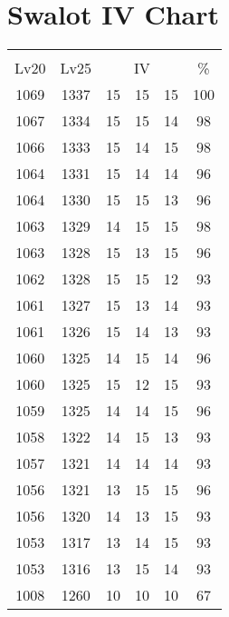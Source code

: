 \documentclass{article}%
\begin{document}
%
\normalsize%
\section{Swalot IV Chart}%
\label{sec:Swalot IV Chart}%
\renewcommand{\arraystretch}{1.5}%
\begin{tabular}{|c|c|c|c|c|c|}%
\hline%
\multicolumn{6}{|c|}{\textcolor{white}{ 
\linebreak{Swalot}
}%
\cellcolor{black}}\\%
\multicolumn{1}{|c}{Lv20}&\multicolumn{1}{c|}{Lv25}&\multicolumn{3}{c|}{IV}&\multicolumn{1}{|c|}{\%}\\%
\hline%
\rowcolor{color100}%
1069&1337&15&15&15&100\\%
\hline%
\rowcolor{color98}%
1067&1334&15&15&14&98\\%
\hline%
\rowcolor{color98}%
1066&1333&15&14&15&98\\%
\hline%
\rowcolor{color96}%
1064&1331&15&14&14&96\\%
\hline%
\rowcolor{color96}%
1064&1330&15&15&13&96\\%
\hline%
\rowcolor{color98}%
1063&1329&14&15&15&98\\%
\hline%
\rowcolor{color96}%
1063&1328&15&13&15&96\\%
\hline%
\rowcolor{color93}%
1062&1328&15&15&12&93\\%
\hline%
\rowcolor{color93}%
1061&1327&15&13&14&93\\%
\hline%
\rowcolor{color93}%
1061&1326&15&14&13&93\\%
\hline%
\rowcolor{color96}%
1060&1325&14&15&14&96\\%
\hline%
\rowcolor{color93}%
1060&1325&15&12&15&93\\%
\hline%
\rowcolor{color96}%
1059&1325&14&14&15&96\\%
\hline%
\rowcolor{color93}%
1058&1322&14&15&13&93\\%
\hline%
\rowcolor{color93}%
1057&1321&14&14&14&93\\%
\hline%
\rowcolor{color96}%
1056&1321&13&15&15&96\\%
\hline%
\rowcolor{color93}%
1056&1320&14&13&15&93\\%
\hline%
\rowcolor{color93}%
1053&1317&13&14&15&93\\%
\hline%
\rowcolor{color93}%
1053&1316&13&15&14&93\\%
\hline%
\rowcolor{color91}%
1008&1260&10&10&10&67\\%
\end{tabular}

%
\end{document}
